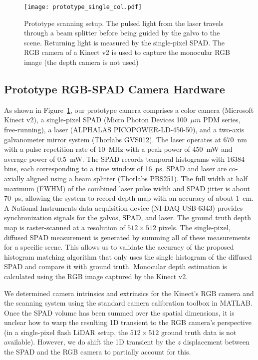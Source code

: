 \begin{figure}[t!]
	\centering
  \texttt{[image: prototype\_single\_col.pdf]}
  \caption{Prototype scanning setup. The pulsed light from the laser travels
    through a beam splitter before being guided by the galvo to the scene.
    Returning light is measured by the single-pixel SPAD. The RGB camera of a
    Kinect v2 is used to capture the monocular RGB image (the depth camera is
    not used)}
  \label{fig:prototype}
\end{figure}

\subsection{Prototype RGB-SPAD Camera Hardware}


As shown in Figure~\ref{fig:prototype}, our prototype camera comprises a color camera (Microsoft Kinect v2), a single-pixel SPAD (Micro Photon Devices 100~$\mu m$ PDM series, free-running), a laser (ALPHALAS PICOPOWER-LD-450-50), and a two-axis galvanometer mirror system (Thorlabs GVS012). The laser operates at 670~nm with a pulse repetition rate of 10~MHz with a peak power of 450~mW and average power of 0.5~mW. The SPAD records temporal histograms with 16384 bins, each corresponding to a time window of 16~ps. SPAD and laser are co-axially aligned using a beam splitter (Thorlabs PBS251). The full width at half maximum (FWHM) of the combined laser pulse width and SPAD jitter is about 70~ps, allowing the system to record depth map with an accuracy of about 1~cm. A National Instruments data acquisition device (NI-DAQ USB-6343) provides synchronization signals for the galvos, SPAD, and laser. The ground truth depth map is raster-scanned at a resolution of $512 \times 512$ pixels. The single-pixel, diffused SPAD measurement is generated by summing all of these measurements for a specific scene. This allows us to validate the accuracy of the proposed histogram matching algorithm that only uses the single histogram of the diffused SPAD and compare it with ground truth. Monocular depth estimation is calculated using the RGB image captured by the Kinect v2.

We determined camera intrinsics and extrinsics for the Kinect's RGB camera and
the scanning system using the standard camera calibration toolbox in MATLAB.
Once the SPAD volume has been summed over the spatial dimensions, it is unclear
how to warp the resulting 1D transient to the RGB camera's perspective (in a
single-pixel flash LiDAR setup, the $512 \times 512$ ground truth data is not
available). However, we do shift the 1D transient by the $z$ displacement
between the SPAD and the RGB camera to partially account for this.

